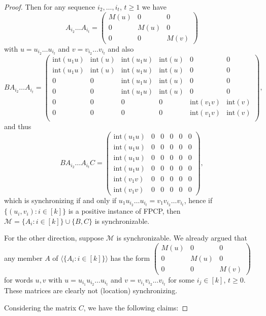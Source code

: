 \documentclass[submission,copyright,creativecommons]{eptcs}
\theoremstyle{plain}
\theoremstyle{definition}
\theoremstyle{remark}
\begin{document}
\begin{proof}
Then for any sequence $i_2,\ldots,i_t$, $t\geq 1$ we have
\[A_{i_2}\ldots A_{i_t}=\left(\begin{array}{lll}M(u)&0&0\\0&M(u)&0\\0&0&M(v)\end{array}\right)\]
with $u=u_{i_2}\ldots u_{i_t}$ and $v=v_{i_2}\ldots v_{i_t}$ and also
\[BA_{i_2}\ldots A_{i_t}=
\left(\begin{array}{llllll}
\mathrm{int}(u_1u)&\mathrm{int}(u)&\mathrm{int}(u_1u)&\mathrm{int}(u)&0&0\\
\mathrm{int}(u_1u)&\mathrm{int}(u)&\mathrm{int}(u_1u)&\mathrm{int}(u)&0&0\\
0&0&\mathrm{int}(u_1u)&\mathrm{int}(u)&0&0\\
0&0&\mathrm{int}(u_1u)&\mathrm{int}(u)&0&0\\
0&0&0&0&\mathrm{int}(v_1v)&\mathrm{int}(v)\\
0&0&0&0&\mathrm{int}(v_1v)&\mathrm{int}(v)\\
\end{array}\right),\]
and thus
\[BA_{i_2}\ldots A_{i_t}C=
\left(\begin{array}{llllll}
\mathrm{int}(u_1u)&0&0&0&0&0\\
\mathrm{int}(u_1u)&0&0&0&0&0\\
\mathrm{int}(u_1u)&0&0&0&0&0\\
\mathrm{int}(u_1u)&0&0&0&0&0\\
\mathrm{int}(v_1v)&0&0&0&0&0\\
\mathrm{int}(v_1v)&0&0&0&0&0
\end{array}\right),\]
which is synchronizing if and only if $u_1u_{i_2}\ldots u_{i_t}=v_1v_{i_2}\ldots v_{i_t}$, hence if $\{(u_i,v_i):i\in[k]\}$ is a positive
instance of FPCP, then $\mathcal{M}=\{A_i:i\in[k]\}\cup\{B,C\}$ is synchronizable.

For the other direction, suppose $\mathcal{M}$ is synchronizable. We already argued that any member $A$ of $\langle \{A_i:i\in[k]\} \rangle$ has the form $\left(\begin{array}{lll}M(u)&0&0\\0&M(u)&0\\0&0&M(v)\end{array}\right)$ for words $u,v$ with $u=u_{i_1}u_{i_2}\ldots u_{i_t}$ and
$v=v_{i_1}v_{i_2}\ldots v_{i_t}$ for some $i_j\in[k]$, $t\geq 0$. These matrices are clearly not (location) synchronizing.

Considering the matrix $C$, we have the following claims:


\end{proof}
\end{document}

